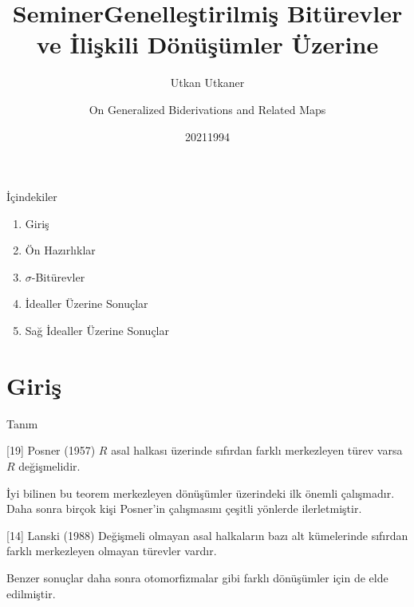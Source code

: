 \documentclass{beamer}
\begin{document}
\title{Seminer}
\author{Utkan Utkaner}
\date{2021}

\frame{\titlepage}

\title{Genelleştirilmiş Bitürevler ve İlişkili Dönüşümler Üzerine}
\author{On Generalized Biderivations and Related Maps}
\date{1994}

\frame{\titlepage}

\begin{frame}{İçindekiler}

\begin{enumerate}
    \item Giriş
    \item Ön Hazırlıklar
    \item $\sigma$-Bitürevler
    \item İdealler Üzerine Sonuçlar
    \item Sağ İdealler Üzerine Sonuçlar
\end{enumerate}
    
\end{frame}

\section{Giriş}

\begin{frame}

\begin{block}{Tanım}

\end{block}
    
\end{frame}

\begin{frame}

\begin{block}{[19] Posner (1957)}
$R$ asal halkası üzerinde sıfırdan farklı merkezleyen türev varsa $R$ değişmelidir.
\end{block}

İyi bilinen bu teorem merkezleyen dönüşümler üzerindeki ilk önemli çalışmadır.\\
Daha sonra birçok kişi Posner'in çalışmasını çeşitli yönlerde ilerletmiştir.

\begin{block}{[14] Lanski (1988)}
Değişmeli olmayan asal halkaların bazı alt kümelerinde sıfırdan farklı merkezleyen olmayan türevler vardır.
\end{block}

Benzer sonuçlar daha sonra otomorfizmalar gibi farklı dönüşümler için de elde edilmiştir.
    
\end{frame}
\end{document}
